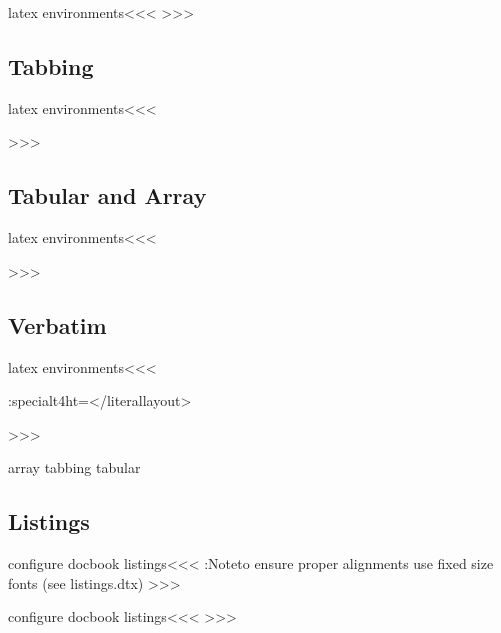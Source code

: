 \<latex environments\><<<
   {\IgnorePar\EndP{}}
   {\IgnorePar\EndP{}\ShowPar}
   {}{}
>>>

\subsection{Tabbing}

\<latex environments\><<<

>>>

\subsection{Tabular and Array}

\<latex environments\><<<

>>>

\subsection{Verbatim}

\<latex environments\><<<
  {\ifinner\else \vfill\break\fi
    \IgnorePar\EndP{}\EndNoFonts}
  {\NoFonts \ht:special{t4ht=</literallayout>}\ShowPar\par}
  {} {}
  {\ifinner\else \vfill\break\fi
    \IgnorePar\EndP{}\EndNoFonts}
  {\NoFonts {}\ShowPar\par}
  {} {}
>>>

    array
    tabbing
    tabular
 

\subsection{Listings}

\<configure docbook listings\><<<
\Log:Note{to ensure proper alignments use
   fixed size fonts (see listings.dtx)}
   {\ifvmode \IgnorePar\fi \EndP 
    {\everypar{}\leavevmode}%
   }
   {{\everypar{}\leavevmode}}
   {}{}
   {}
   {}
>>>

\<configure docbook listings\><<<
   {\ifvmode \IgnorePar\fi \EndP  
    \bgroup 
         {{\everypar{}\leavevmode}}
         {{\everypar{}\leavevmode}}
         {}{}%
   }
   {\egroup \ifvmode \IgnorePar\fi \EndP   {}}
   {} {}
>>>


